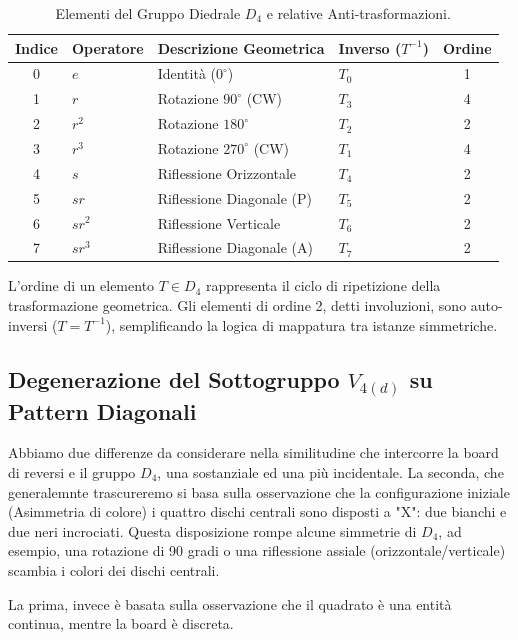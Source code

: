 \begin{table}[h]
\centering
\caption{Elementi del Gruppo Diedrale $D_4$ e relative Anti-trasformazioni.}
\label{tab:d4_inverses}
\begin{tabular}{@{}clllc@{}}
\hline
\textbf{Indice} & \textbf{Operatore} & \textbf{Descrizione Geometrica} & \textbf{Inverso ($T^{-1}$)} & \textbf{Ordine} \\ \hline
0 & $e$      & Identità ($0^\circ$)          & $T_0$ & 1 \\
1 & $r$      & Rotazione $90^\circ$ (CW)     & $T_3$ & 4 \\
2 & $r^2$    & Rotazione $180^\circ$         & $T_2$ & 2 \\
3 & $r^3$    & Rotazione $270^\circ$ (CW)    & $T_1$ & 4 \\
4 & $s$      & Riflessione Orizzontale       & $T_4$ & 2 \\
5 & $sr$     & Riflessione Diagonale (P)     & $T_5$ & 2 \\
6 & $sr^2$   & Riflessione Verticale         & $T_6$ & 2 \\
7 & $sr^3$   & Riflessione Diagonale (A)     & $T_7$ & 2 \\ \hline
\end{tabular}
\end{table}

L'ordine di un elemento \(T\in D_{4}\) rappresenta il ciclo di ripetizione della trasformazione geometrica.
Gli elementi di ordine 2, detti involuzioni, sono auto-inversi (\(T=T^{-1}\)), semplificando la logica di mappatura tra istanze simmetriche.

\subsection{Degenerazione del Sottogruppo $V_{4(d)}$ su Pattern Diagonali}
Abbiamo due differenze da considerare nella similitudine che intercorre la board di reversi e il gruppo $D_4$, una sostanziale ed una più incidentale. 
La seconda, che generalemnte trascureremo si basa sulla osservazione che la configurazione iniziale (Asimmetria di colore) i quattro dischi centrali sono disposti a "X": due bianchi e due neri incrociati.
Questa disposizione rompe alcune simmetrie di $D_4$, ad esempio, una rotazione di 90 gradi o una riflessione assiale (orizzontale/verticale) scambia i colori dei dischi centrali.

La prima, invece è basata sulla osservazione che il quadrato è una entità continua, mentre la board è discreta.

